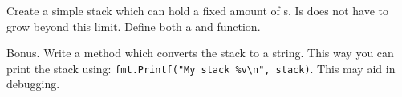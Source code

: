 \begin{Exercise}[title={Stack},difficulty=5]

\label{ex:stack}
\Question \label{ex:stack q1} Create a simple stack which can hold a
fixed amount of s. Is does not have to grow beyond this limit.
Define both a  and  function.

\Question \label{ex:stack q2} Bonus. Write a  method which 
converts the stack to a string. This way you can print the stack using:
\lstinline{fmt.Printf("My stack %v\n", stack)}. This may aid in
debugging.
\end{Exercise}

\begin{Answer}

\Question 

\Question 

\end{Answer}

